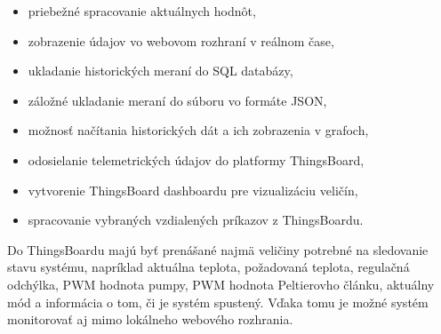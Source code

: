 \begin{itemize}
    \item priebežné spracovanie aktuálnych hodnôt,
    \item zobrazenie údajov vo webovom rozhraní v reálnom čase,
    \item ukladanie historických meraní do SQL databázy,
    \item záložné ukladanie meraní do súboru vo formáte JSON,
    \item možnosť načítania historických dát a ich zobrazenia v grafoch,
    \item odosielanie telemetrických údajov do platformy ThingsBoard,
    \item vytvorenie ThingsBoard dashboardu pre vizualizáciu veličín,
    \item spracovanie vybraných vzdialených príkazov z ThingsBoardu.
\end{itemize}

Do ThingsBoardu majú byť prenášané najmä veličiny potrebné na sledovanie stavu systému, 
napríklad aktuálna teplota, požadovaná teplota, regulačná odchýlka, PWM hodnota pumpy, 
PWM hodnota Peltierovho článku, aktuálny mód a informácia o tom, či je systém spustený. 
Vďaka tomu je možné systém monitorovať aj mimo lokálneho webového rozhrania.

